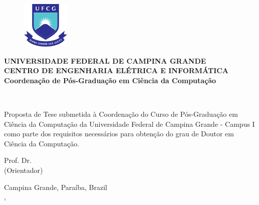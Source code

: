 \begin{figure}[H]
\centering
\includegraphics[height=85px]{images/logo_ufcg.png}
\end{figure}

\begin{center}
\textbf{UNIVERSIDADE FEDERAL DE CAMPINA GRANDE} \\
\textbf{CENTRO DE ENGENHARIA ELÉTRICA E INFORMÁTICA} \\
\textbf{Coordenação de Pós-Graduação em Ciência da Computação}
\vspace{3em}

\Large{}
\thetitle
\vspace{3em}

\Large{\theauthor}\\
\vspace{2em}

\normalsize{\parbox[t]{122mm}{Proposta de Tese submetida à Coordenação do Curso de Pós-Graduação em Ciência da Computação da Universidade Federal de Campina Grande - Campus I como parte dos requisitos necessários para obtenção do grau de Doutor em Ciência da Computação.}}
\vspace{6em}


Prof. Dr. \profa\\
(Orientador) \\
\vfill

Campina Grande, Paraíba, Brazil \\
\MONTH, \the\year
\end{center}